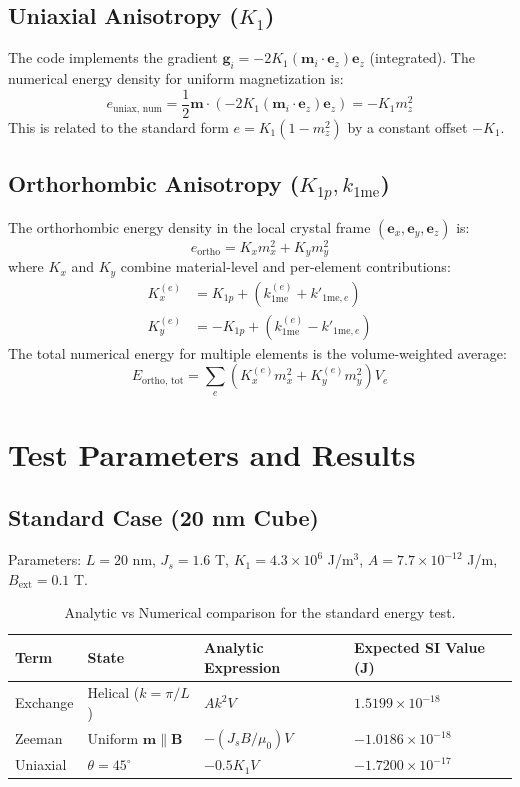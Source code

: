 \documentclass[11pt]{article}
\begin{document}
\subsection{Uniaxial Anisotropy ($K_1$)}
The code implements the gradient $\mathbf{g}_{i} = -2 K_1 (\mathbf{m}_i \cdot \mathbf{e}_z) \mathbf{e}_z$ (integrated). The numerical energy density for uniform magnetization is:
\begin{equation}
    e_{\text{uniax, num}} = \frac{1}{2} \mathbf{m} \cdot \left( -2 K_1 (\mathbf{m}_i \cdot \mathbf{e}_z) \mathbf{e}_z \right) = -K_1 m_z^2
\end{equation}
This is related to the standard form $e = K_1(1 - m_z^2)$ by a constant offset $-K_1$.

\subsection{Orthorhombic Anisotropy ($K_{1p}, k_{1\text{me}}$)}
The orthorhombic energy density in the local crystal frame $(\mathbf{e}_x, \mathbf{e}_y, \mathbf{e}_z)$ is:
\begin{equation}
    e_{\text{ortho}} = K_x m_x^2 + K_y m_y^2
\end{equation}
where $K_x$ and $K_y$ combine material-level and per-element contributions:
\begin{align}
    K_x^{(e)} &= K_{1p} + (k_{1\text{me}}^{(e)} + k'_{1\text{me}, e}) \\
    K_y^{(e)} &= -K_{1p} + (k_{1\text{me}}^{(e)} - k'_{1\text{me}, e})
\end{align}
The total numerical energy for multiple elements is the volume-weighted average:
\begin{equation}
    E_{\text{ortho, tot}} = \sum_e (K_x^{(e)} m_x^2 + K_y^{(e)} m_y^2) V_e
\end{equation}

\section{Test Parameters and Results}

\subsection{Standard Case (20 nm Cube)}
Parameters: $L=20$ nm, $J_s=1.6$ T, $K_1=4.3 \times 10^6$ J/m$^3$, $A=7.7 \times 10^{-12}$ J/m, $B_{\text{ext}}=0.1$ T.
\begin{table}[h]
\centering
\begin{tabular}{@{}llll@{}}
\toprule
Term & State & Analytic Expression & Expected SI Value (J) \\ \midrule
Exchange & Helical ($k=\pi/L$) & $A k^2 V$ & $1.5199 \times 10^{-18}$ \\
Zeeman & Uniform $\mathbf{m} \parallel \mathbf{B}$ & $-(J_s B / \mu_0) V$ & $-1.0186 \times 10^{-18}$ \\
Uniaxial & $\theta = 45^\circ$ & $-0.5 K_1 V$ & $-1.7200 \times 10^{-17}$ \\ \bottomrule
\end{tabular}
\caption{Analytic vs Numerical comparison for the standard energy test.}
\end{table}
\end{document}
